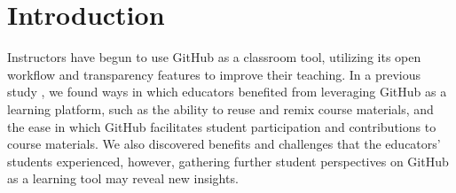\section{Introduction}



Instructors have begun to use GitHub as a classroom tool, utilizing its open workflow and transparency features to improve their teaching. In a previous study \cite{zagalsky2015emergence}, we found ways in which educators benefited from leveraging GitHub as a learning platform, such as the ability to reuse and remix course materials, and the ease in which GitHub facilitates student participation and contributions to course materials. We also discovered benefits and challenges that the educators' students experienced, however, gathering further student perspectives on GitHub as a learning tool may reveal new insights.




